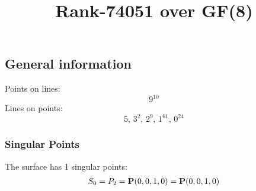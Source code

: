 \documentclass{article}
\newcommand\setTBstruts{\def\T{\rule{0pt}{2.6ex}}%
\def\B{\rule[-1.2ex]{0pt}{0pt}}}
\newcommand{\bP}{{\bf P}}
\begin{document}
 
\setTBstruts



{\allowdisplaybreaks%






\title{Rank-74051 over GF(8)}
\author{}%
\maketitle%
%
{}



\subsection*{General information}
Points on lines:
$$
9^{10}$$
Lines on points:
$$
5,\,3^2,\,2^9,\,1^{61},\,0^{24}$$
\subsubsection*{Singular Points}
The surface has 1 singular points:\\
\begin{align*}
S_{0} &= P_{2}=\bP(0, 0, 1, 0) = \bP(0, 0, 1, 0)\\
\end{align*}
}
\end{document}
